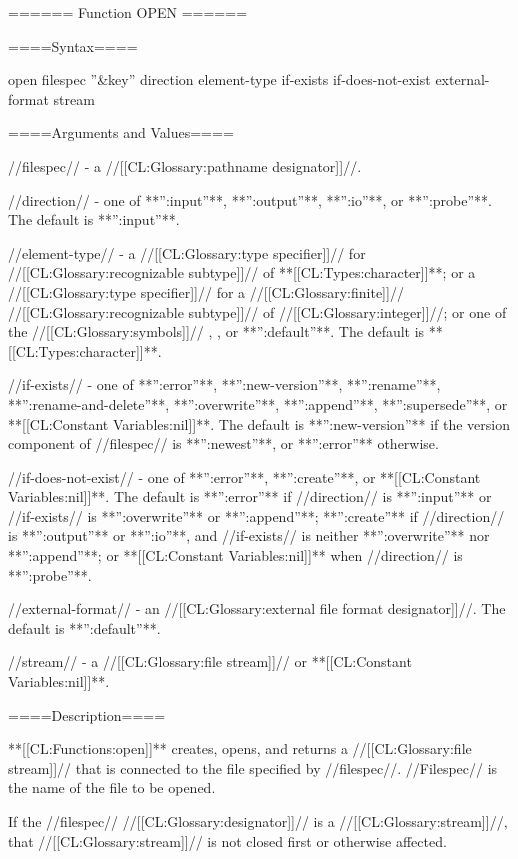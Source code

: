 ====== Function OPEN ======

====Syntax====

\DefunWithValuesNewline open {filespec ''&key'' direction element-type if-exists if-does-not-exist external-format} {stream}

====Arguments and Values====

//filespec// - a //[[CL:Glossary:pathname designator]]//.

//direction// - one of **'':input''**, **'':output''**, **'':io''**, or **'':probe''**. The default is **'':input''**.

//element-type// - a //[[CL:Glossary:type specifier]]// for //[[CL:Glossary:recognizable subtype]]// of **[[CL:Types:character]]**; or a //[[CL:Glossary:type specifier]]// for a //[[CL:Glossary:finite]]// //[[CL:Glossary:recognizable subtype]]// of //[[CL:Glossary:integer]]//; or one of the //[[CL:Glossary:symbols]]// , , or **'':default''**. The default is **[[CL:Types:character]]**.

//if-exists// - one of **'':error''**, **'':new-version''**, **'':rename''**, **'':rename-and-delete''**, **'':overwrite''**, **'':append''**, **'':supersede''**, or **[[CL:Constant Variables:nil]]**. The default is **'':new-version''** if the version component of //filespec// is **'':newest''**, or **'':error''** otherwise.

//if-does-not-exist// - one of **'':error''**, **'':create''**, or **[[CL:Constant Variables:nil]]**. The default is **'':error''** if //direction// is **'':input''** or //if-exists// is **'':overwrite''** or **'':append''**; **'':create''** if //direction// is **'':output''** or **'':io''**, and //if-exists// is neither **'':overwrite''** nor **'':append''**; or **[[CL:Constant Variables:nil]]** when //direction// is **'':probe''**.

//external-format// - an //[[CL:Glossary:external file format designator]]//. The default is **'':default''**.

//stream// - a //[[CL:Glossary:file stream]]// or **[[CL:Constant Variables:nil]]**.

====Description====

**[[CL:Functions:open]]** creates, opens, and returns a //[[CL:Glossary:file stream]]// that is connected to the file specified by //filespec//. //Filespec// is the name of the file to be opened.

If the //filespec// //[[CL:Glossary:designator]]// is a //[[CL:Glossary:stream]]//, that //[[CL:Glossary:stream]]// is not closed first or otherwise affected.

